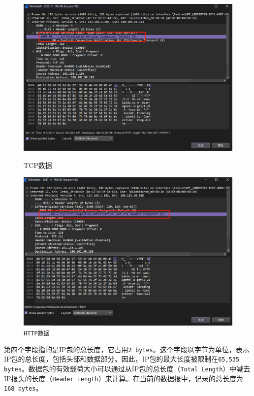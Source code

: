 \documentclass{article}
\begin{document}
	\begin{figure}[H]
		\centering
		\begin{minipage}[b]{0.45\textwidth}
			\includegraphics[width=\textwidth]{images/8. DSCP字段.jpg}
			\caption{TCP数据}
		\end{minipage}
		\hfill
		\begin{minipage}[b]{0.45\textwidth}
			\includegraphics[width=\textwidth]{images/9. ECN字段.jpg}
			\caption{\texttt{HTTP数据}}
		\end{minipage}
	\end{figure}
	
	第四个字段指的是IP包的总长度，它占用\texttt{2 bytes}。这个字段以字节为单位，表示IP包的总长度，包括头部和数据部分。因此，IP包的最大长度被限制在\texttt{65,535 bytes}。数据包的有效载荷大小可以通过从IP包的总长度（\texttt{Total Length}）中减去IP报头的长度（\texttt{Header Length}）来计算。在当前的数据报中，记录的总长度为\texttt{168 bytes}。
	
\end{document}
